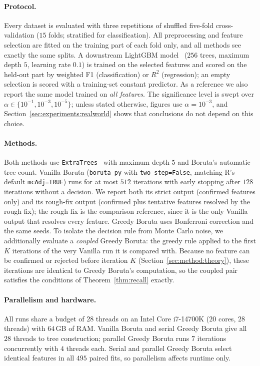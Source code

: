 \documentclass[runningheads]{llncs}
\begin{document}

\paragraph{Protocol.} Every dataset is evaluated with three repetitions of shuffled five-fold cross-validation ($15$ folds; stratified for classification). All preprocessing and feature selection are fitted on the training part of each fold only, and all methods see exactly the same splits. A downstream LightGBM model~\cite{ke2017lightgbm} ($256$ trees, maximum depth $5$, learning rate $0.1$) is trained on the selected features and scored on the held-out part by weighted F1 (classification) or $R^2$ (regression); an empty selection is scored with a training-set constant predictor. As a reference we also report the same model trained on \emph{all features}. The significance level is swept over $\alpha\in\{10^{-1},10^{-3},10^{-5}\}$; unless stated otherwise, figures use $\alpha=10^{-3}$, and Section~\ref{sec:experiments:realworld} shows that conclusions do not depend on this choice.

\paragraph{Methods.} Both methods use \texttt{ExtraTrees}~\cite{geurts2006extremely,pedregosa2011scikit} with maximum depth $5$ and Boruta's automatic tree count. Vanilla Boruta (\texttt{boruta\_py} with \texttt{two\_step=False}, matching R's default \texttt{mcAdj=TRUE}) runs for at most $512$ iterations with early stopping after $128$ iterations without a decision. We report both its strict output (confirmed features only) and its rough-fix output (confirmed plus tentative features resolved by the rough fix); the rough fix is the comparison reference, since it is the only Vanilla output that resolves every feature. Greedy Boruta uses Bonferroni correction and the same seeds. To isolate the decision rule from Monte Carlo noise, we additionally evaluate a \emph{coupled} Greedy Boruta: the greedy rule applied to the first $K$ iterations of the very Vanilla run it is compared with. Because no feature can be confirmed or rejected before iteration $K$ (Section~\ref{sec:method:theory}), these iterations are identical to Greedy Boruta's computation, so the coupled pair satisfies the conditions of Theorem~\ref{thm:recall} exactly.

\paragraph{Parallelism and hardware.} All runs share a budget of $28$ threads on an Intel Core i7-14700K ($20$ cores, $28$ threads) with $64$\,GB of RAM. Vanilla Boruta and serial Greedy Boruta give all $28$ threads to tree construction; parallel Greedy Boruta runs $7$ iterations concurrently with $4$ threads each. Serial and parallel Greedy Boruta select identical features in all $495$ paired fits, so parallelism affects runtime only.
\end{document}

